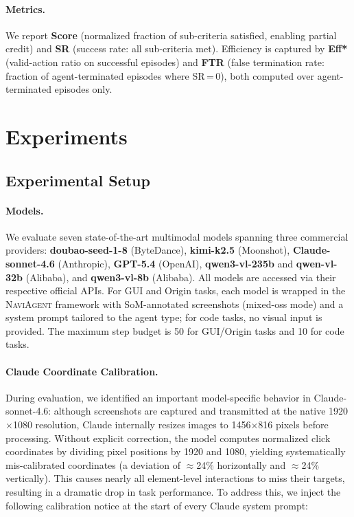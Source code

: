 \documentclass{article}
\begin{document}
\paragraph{Metrics.}
We report \textbf{Score} (normalized fraction of sub-criteria satisfied, enabling
partial credit) and \textbf{SR} (success rate: all sub-criteria met).
Efficiency is captured by \textbf{Eff*} (valid-action ratio on successful episodes)
and \textbf{FTR} (false termination rate: fraction of agent-terminated episodes where
SR\,=\,0), both computed over agent-terminated episodes only.



\section{Experiments}
\label{sec:experiments}

\subsection{Experimental Setup}
\label{sec:setup}

\paragraph{Models.}
We evaluate seven state-of-the-art multimodal models spanning three commercial providers:
\textbf{doubao-seed-1-8} (ByteDance), \textbf{kimi-k2.5} (Moonshot), \textbf{Claude-sonnet-4.6} (Anthropic),
\textbf{GPT-5.4} (OpenAI), \textbf{qwen3-vl-235b} and \textbf{qwen-vl-32b} (Alibaba),
and \textbf{qwen3-vl-8b} (Alibaba).
All models are accessed via their respective official APIs.
For GUI and Origin tasks, each model is wrapped in the \textsc{NaviAgent} framework
with SoM-annotated screenshots (mixed-oss mode) and a system prompt tailored to the agent type;
for code tasks, no visual input is provided.
The maximum step budget is 50 for GUI/Origin tasks and 10 for code tasks.

\paragraph{Claude Coordinate Calibration.}
\label{sec:claude-coord}
During evaluation, we identified an important model-specific behavior in Claude-sonnet-4.6:
although screenshots are captured and transmitted at the native 1920$\times$1080 resolution,
Claude internally resizes images to 1456$\times$816 pixels before processing.
Without explicit correction, the model computes normalized click coordinates by dividing pixel
positions by 1920 and 1080, yielding systematically mis-calibrated coordinates
(a deviation of $\approx$24\% horizontally and $\approx$24\% vertically).
This causes nearly all element-level interactions to miss their targets, resulting in a dramatic
drop in task performance.
To address this, we inject the following calibration notice at the start of every Claude system prompt:
\end{document}
